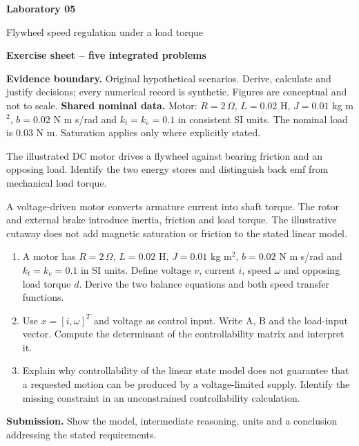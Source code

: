 \documentclass[10pt,a4paper]{article}
\newcommand{\task}[2]{\par\medskip{\color{ink}\Large\bfseries #1. #2}\par\smallskip}
\begin{document}
{\color{ink}\LARGE\bfseries Laboratory 05}\par
{\large Flywheel speed regulation under a load torque}\par
\textbf{Exercise sheet -- five integrated problems}\par
{\small\textbf{Evidence boundary.} Original hypothetical scenarios. Derive, calculate and justify decisions; every numerical record is synthetic. Figures are conceptual and not to scale.}
\smallskip\textbf{Shared nominal data.} Motor: $R=2\,\Omega$, $L=0.02$ H, $J=0.01$ kg m$^2$, $b=0.02$ N m s/rad and $k_t=k_e=0.1$ in consistent SI units. The nominal load is 0.03 N m. Saturation applies only where explicitly stated.
\par{}
\task{1}{From armature current to flywheel motion}
The illustrated DC motor drives a flywheel against bearing friction and an opposing load. Identify the two energy stores and distinguish back emf from mechanical load torque.
\begin{center}\resizebox{.88\linewidth}{!}{}\par{\small A voltage-driven motor converts armature current into shaft torque. The rotor and external brake introduce inertia, friction and load torque. The illustrative cutaway does not add magnetic saturation or friction to the stated linear model.}\end{center}
\begin{enumerate}
\item A motor has $R=2\,\Omega$, $L=0.02$ H, $J=0.01$ kg m$^2$, $b=0.02$ N m s/rad and $k_t=k_e=0.1$ in SI units. Define voltage $v$, current $i$, speed $\omega$ and opposing load torque $d$. Derive the two balance equations and both speed transfer functions.
\item Use $x=[i,\omega]^T$ and voltage as control input. Write A, B and the load-input vector. Compute the determinant of the controllability matrix and interpret it.
\item Explain why controllability of the linear state model does not guarantee that a requested motion can be produced by a voltage-limited supply. Identify the missing constraint in an unconstrained controllability calculation.
\end{enumerate}
\vfill{\small\textbf{Submission.} Show the model, intermediate reasoning, units and a conclusion addressing the stated requirements.}
\end{document}
